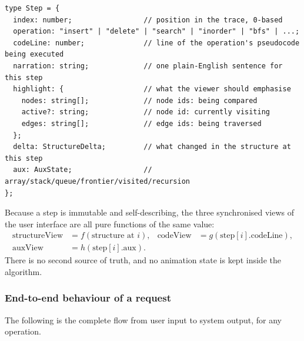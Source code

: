 \documentclass[11pt,a4paper]{article}
\begin{document}
\begin{lstlisting}[style=ts,caption={The step record. Every field is serialisable, which is
what allows the same trace to travel through a Web Worker, be stored in a test fixture, and
be rendered by React.},label={lst:step}]
type Step = {
  index: number;                 // position in the trace, 0-based
  operation: "insert" | "delete" | "search" | "inorder" | "bfs" | ...;
  codeLine: number;              // line of the operation's pseudocode being executed
  narration: string;             // one plain-English sentence for this step
  highlight: {                   // what the viewer should emphasise
    nodes: string[];             // node ids: being compared
    active?: string;             // node id: currently visiting
    edges: string[];             // edge ids: being traversed
  };
  delta: StructureDelta;         // what changed in the structure at this step
  aux: AuxState;                 // array/stack/queue/frontier/visited/recursion
};
\end{lstlisting}

Because a step is immutable and self-describing, the three synchronised views of the user
interface are all pure functions of the same value:
\begin{align*}
\text{structureView} &= f(\text{structure at } i), &
\text{codeView} &= g(\text{step}[i].\text{codeLine}), \\
\text{auxView} &= h(\text{step}[i].\text{aux}). &&
\end{align*}
There is no second source of truth, and no animation state is kept inside the algorithm.

\subsubsection{End-to-end behaviour of a request}

The following is the complete flow from user input to system output, for any operation.
\end{document}
